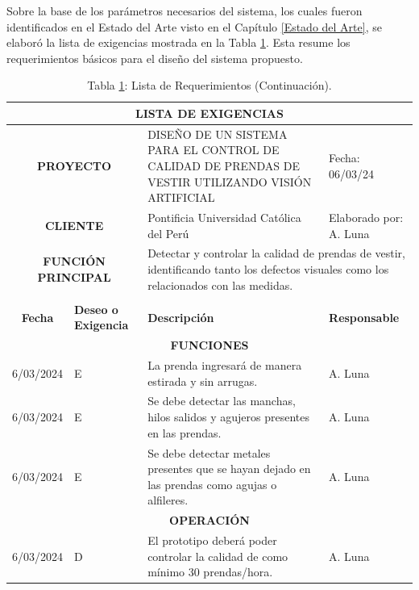 Sobre la base de los parámetros necesarios del sistema, los cuales fueron identificados en el Estado del Arte visto en el Capítulo \ref{Estado del Arte}, se elaboró la lista de exigencias mostrada en la Tabla \ref{tab:lista_exigencias}. Esta resume los requerimientos básicos para el diseño del sistema propuesto.

\begin{longtable}{|c|p{4.5em}|p{22.5em}|p{6em}|}
	\caption[Lista de Requerimientos.]{Lista de Requerimientos. Fuente: Elaboración propia.}\label{tab:lista_exigencias}\\
	\hline
	\multicolumn{4}{|p{37.5em}|}{\textbf{LISTA DE EXIGENCIAS}} \bigstrut\\
	\hline
	\multicolumn{2}{|p{9em}|}{\textbf{PROYECTO}} & DISEÑO DE UN SISTEMA PARA EL CONTROL DE CALIDAD DE PRENDAS DE VESTIR UTILIZANDO VISIÓN ARTIFICIAL & Fecha: 06/03/24 \bigstrut\\
	\hline
	\multicolumn{2}{|p{9em}|}{\textbf{CLIENTE}} & Pontificia Universidad Católica del Perú & Elaborado por: A. Luna \bigstrut\\
	\hline
	\multicolumn{2}{|p{9em}|}{\parbox{4cm}{\textbf{FUNCIÓN} \\ \textbf{PRINCIPAL}}
	} & \multicolumn{2}{p{28.5em}|}{Detectar y controlar la calidad de prendas de vestir, identificando tanto los defectos visuales como los relacionados con las medidas.} \bigstrut\\
	\hline
	\endfirsthead \caption* {Tabla \ref{tab:lista_exigencias}: Lista de Requerimientos (Continuación).}\\
	\hline
	\multicolumn{1}{|p{4.5em}|}{\textbf{Fecha}} & \textbf{Deseo o Exigencia} & \textbf{Descripción} & \textbf{Responsable} \bigstrut\\
	\hline
	\endhead
	\multicolumn{4}{|p{37.5em}|}{\textbf{FUNCIONES}} \bigstrut\\
	\hline
	6/03/2024 & E     & La prenda ingresará de manera estirada y sin arrugas. & A. Luna \bigstrut\\
	\hline
	6/03/2024 & E     & Se debe detectar las manchas, hilos salidos y agujeros presentes en las prendas. & A. Luna \bigstrut\\
	\hline
	6/03/2024 & E     & Se debe detectar metales presentes que se hayan dejado en las prendas como agujas o alfileres. & A. Luna \bigstrut\\
	\hline
	\multicolumn{4}{|p{37.5em}|}{\textbf{OPERACIÓN}} \bigstrut\\
	\hline
	6/03/2024 & D     & El prototipo deberá poder controlar la calidad de como mínimo 30 prendas/hora. & A. Luna \bigstrut\\

\end{longtable}
